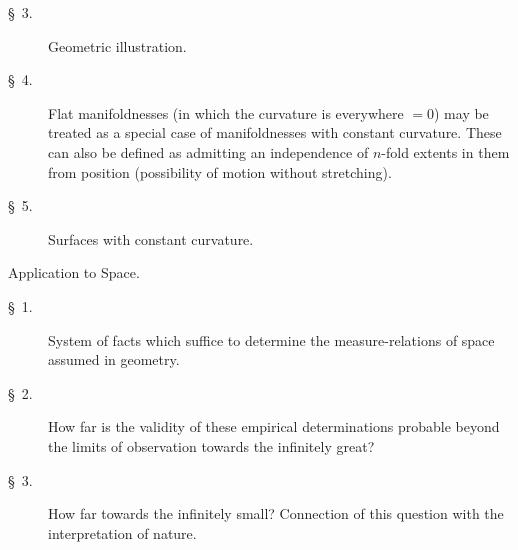 \documentclass[a4paper,12pt]{article}
\begin{document}
\begin{description}
\begin{description}
\item[\textmd{\S~3.}]
Geometric illustration.

\item[\textmd{\S~4.}]
Flat manifoldnesses (in which the curvature is everywhere $= 0$)
may be treated as a special case of manifoldnesses with constant
curvature.  These can also be defined as admitting an
independence of $n$-fold extents in them from position
(possibility of motion without stretching).

\item[\textmd{\S~5.}]
Surfaces with constant curvature.

\end{description}


\item[\textmd{III.}]
Application to Space.

\begin{description}
\item[\textmd{\S~1.}]
System of facts which suffice to determine the measure-relations
of space assumed in geometry.

\item[\textmd{\S~2.}]
How far is the validity of these empirical determinations
probable beyond the limits of observation towards the infinitely
great?

\item[\textmd{\S~3.}]
How far towards the infinitely small?  Connection of this
question with the interpretation of nature.

\end{description}
\end{description}
\end{document}
